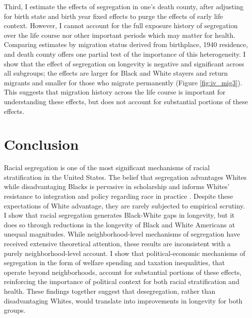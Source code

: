 \documentclass[11pt]{article}
\begin{document}
Third, I estimate the effects of segregation in one's death county, after adjusting for birth state and birth year fixed effects to purge the effects of early life context. However, I cannot account for the full exposure history of segregation over the life course nor other important periods which may matter for health. Comparing estimates by migration status derived from birthplace, 1940 residence, and death county offers one partial test of the importance of this heterogeneity. I show that the effect of segregation on longevity is negative and significant across all subgroups; the effects are larger for Black and White stayers and return migrants and smaller for those who migrate permanently (Figure \ref{fig:iv_mig3}). This suggests that migration history across the life course is important for understanding these effects, but does not account for substantial portions of these effects.

\section{Conclusion}
Racial segregation is one of the most significant mechanisms of racial stratification in the United States. The belief that segregation advantages Whites while disadvantaging Blacks is pervasive in scholarship and informs Whites' resistance to integration and policy regarding race in practice \citep{bobo_attitudes_1996,wetts_privilege_2018}. Despite these expectations of White advantage, they are rarely subjected to empirical scrutiny. I show that racial segregation generates Black-White gaps in longevity, but it does so through reductions in the longevity of Black and White Americans at unequal magnitudes. While neighborhood-level mechanisms of segregation have received extensive theoretical attention, these results are inconsistent with a purely neighborhood-level account. I show that political-economic mechanisms of segregation in the form of welfare spending and taxation inequalities, that operate beyond neighborhoods, account for substantial portions of these effects, reinforcing the importance of political context for both racial stratification and health. These findings together suggest that desegregation, rather than disadvantaging Whites, would translate into improvements in longevity for both groups. 

\pagebreak
\end{document}
